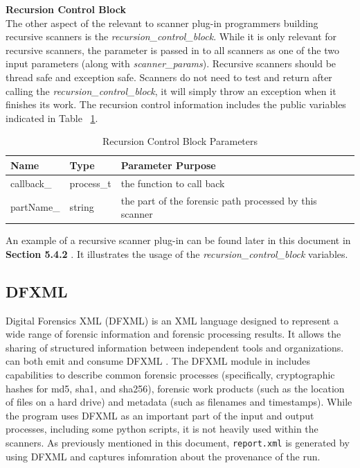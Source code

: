 \documentclass[11pt,fleqn]{article} %
\begin{document}
\textbf{Recursion Control Block} \\
The other aspect of the \beapi relevant to scanner plug-in programmers building recursive scanners is the \textit{recursion\_control\_block}. While it is only relevant for recursive scanners, the parameter is passed in to all scanners as one of the two input parameters (along with \textit{scanner\_params}). Recursive scanners should be thread safe and exception safe.  Scanners do not need to test and return after calling the \textit{recursion\_control\_block}, it will simply throw an exception when it finishes its work. The recursion control information includes the public variables indicated in Table ~\ref{tab:RecursionControlBlockParams}. 
\begin{table}[ht]

\centering
\caption{Recursion Control Block Parameters}
\label{tab:RecursionControlBlockParams}
\begin{tabular}{|p{3 cm}|p{2 cm}|p{7 cm}|}
\hline \hline
\textbf{Name} & \textbf{Type} & \textbf{Parameter Purpose} \\
\hline
callback\_  & process\_t & the function to call back \\
\hline
partName\_ & string & the part of the forensic path processed by this scanner \\
\hline
\end{tabular}
\end{table}

An example of a recursive scanner plug-in can be found later in this document in \textbf{Section 5.4.2} \textbf{}. It illustrates the usage of the \textit{recursion\_control\_block} variables.


\subsection{DFXML}
\label{DFXMLSection}
Digital Forensics XML (DFXML) is an XML language designed to represent a wide range of forensic information and forensic processing results. It allows the sharing of structured information between independent tools and organizations. \bulk can both emit and consume DFXML \cite{dfxmlpaper}. The DFXML module in \bulk includes capabilities to describe common forensic processes (specifically, cryptographic hashes for md5, sha1, and sha256), forensic work products (such as the location of files on a hard drive) and metadata (such as filenames and timestamps). While the \bulk program uses DFXML as an important part of the input and output processes, including some python scripts, it is not heavily used within the scanners. As previously mentioned in this document, \texttt{report.xml} is generated by \bulk using DFXML and captures infomration about the provenance of the \bulk run.
\end{document}
